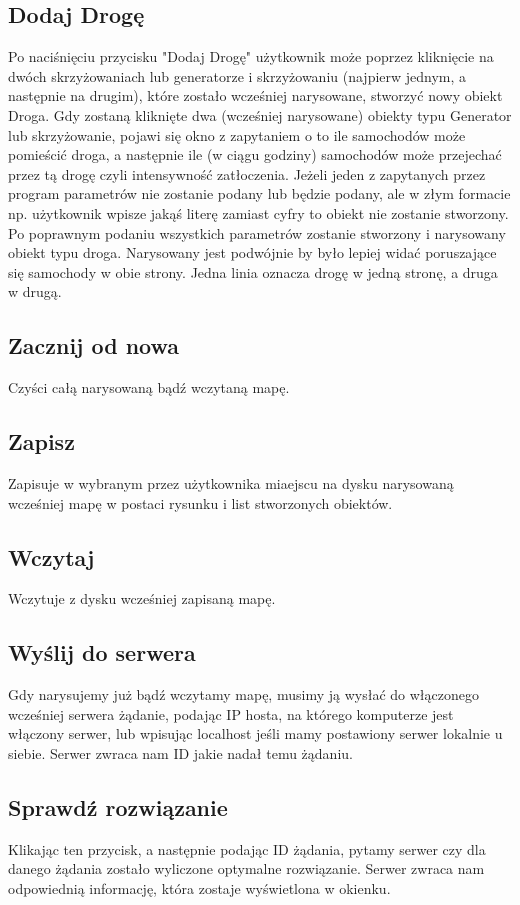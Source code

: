 \documentclass{article}
\begin{document}
\subsection{Dodaj Drogę}
    Po naciśnięciu przycisku "Dodaj Drogę" użytkownik może poprzez kliknięcie na dwóch skrzyżowaniach lub generatorze i skrzyżowaniu (najpierw jednym, a następnie na drugim), które zostało wcześniej narysowane, stworzyć nowy obiekt Droga. Gdy zostaną kliknięte dwa (wcześniej narysowane) obiekty typu Generator lub skrzyżowanie, pojawi się okno z zapytaniem o to ile samochodów może pomieścić droga, a następnie ile (w ciągu godziny) samochodów może przejechać przez tą drogę czyli intensywność zatłoczenia. Jeżeli jeden z zapytanych przez program parametrów nie zostanie podany lub będzie podany, ale w złym formacie np. użytkownik wpisze jakąś literę zamiast cyfry to obiekt nie zostanie stworzony. Po poprawnym podaniu wszystkich parametrów zostanie stworzony i narysowany obiekt typu droga. Narysowany jest podwójnie by było lepiej widać poruszające się samochody w obie strony. Jedna linia oznacza drogę w jedną stronę, a druga w drugą.

\subsection{Zacznij od nowa}
    Czyści całą narysowaną bądź wczytaną mapę.

\subsection{Zapisz}
    Zapisuje w wybranym przez użytkownika miaejscu na dysku narysowaną wcześniej mapę w postaci rysunku i list stworzonych obiektów.

\subsection{Wczytaj}
    Wczytuje z dysku wcześniej zapisaną mapę.

\subsection{Wyślij do serwera}
    Gdy narysujemy już bądź wczytamy mapę, musimy ją wysłać do włączonego wcześniej serwera żądanie, podając IP hosta, na którego komputerze jest włączony serwer, lub wpisując localhost jeśli mamy postawiony serwer lokalnie u siebie. Serwer zwraca nam ID jakie nadał temu żądaniu.

\subsection{Sprawdź rozwiązanie}
    Klikając ten przycisk, a następnie podając ID żądania, pytamy serwer czy dla danego żądania zostało wyliczone optymalne rozwiązanie. Serwer zwraca nam odpowiednią informację, która zostaje wyświetlona w okienku.
\end{document}
